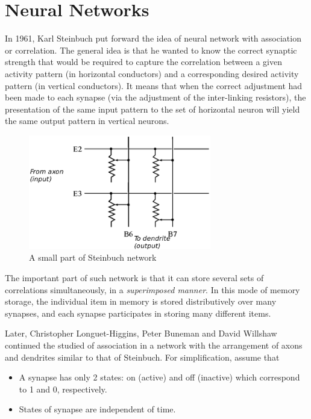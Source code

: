 \section{Neural Networks}
\label{sec:neural-networks}



In 1961,  Karl Steinbuch put forward  the idea of  neural network with
association or correlation. The general idea is that he wanted to know
the correct  synaptic strength that  would be required to  capture the
correlation   between  a   given  activity   pattern   (in  horizontal
conductors) and a corresponding  desired activity pattern (in vertical
conductors). It means  that when the correct adjustment  had been made
to each  synapse (via the adjustment of  the inter-linking resistors),
the presentation  of the same input  pattern to the  set of horizontal
neuron will yield the same output pattern in vertical neurons.


\begin{figure}[htb]
  \centerline{\includegraphics[height=5cm]{./images/Steinbuch_network.eps}}
  \caption{A small part of Steinbuch network}\label{fig:Steinbuch}
\end{figure}

The important part of such network is that it can store several sets
of correlations simultaneously, in a {\it superimposed manner}. In
this mode of memory storage, the individual item in memory is stored
distributively over many synapses, and each synapse participates in
storing many different items.


Later, Christopher Longuet-Higgins, Peter Buneman and David Willshaw
continued the studied of association in a network with the arrangement
of axons and dendrites similar to that of Steinbuch. For
simplification, assume that
\begin{itemize}
\item A synapse has only 2 states: on (active) and off (inactive) which
  correspond to 1 and 0, respectively.
\item States of synapse are independent of time.
\end{itemize}

